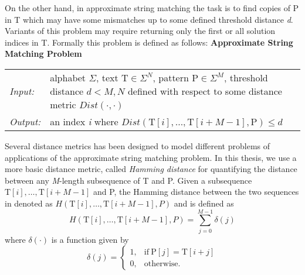 On the other hand, in approximate string matching the task is to find copies of P in T which may have some mismatches up to some defined threshold distance \textit{d}. Variants of this problem may require returning only the first or all solution indices in T. Formally this problem is defined as follows:\newline
\newline	
	\textbf{Approximate String Matching Problem}\\
	\begin{tabular}{ l  p{10cm}}
		\textit{Input:} & alphabet $\Sigma$, text $\mathrm{T} \in \Sigma^N$, pattern $\mathrm{P} \in \Sigma^M$, threshold distance $d < M,N$ defined with respect to some distance metric $Dist(\cdot,\cdot)$\\
		\textit{Output:} & an index \textit{i} where $Dist(\mathrm{T}[i],\ldots,\mathrm{T}[i+M-1],\mathrm{P}) \leq d$
	\end{tabular}\newline

Several distance metrics has been designed to model different problems of applications of the approximate string matching problem. In this thesis, we use a more basic distance metric, called \textit{Hamming distance} for quantifying the distance between any \textit{M}-length subsequence of T and P. Given a subsequence $\mathrm{T}[i],\ldots,\mathrm{T}[i+M-1]$ and P, the Hamming distance between the two sequences in denoted as $H\left( \mathrm{T}[i],\ldots,\mathrm{T}[i+M-1], P \right)$ and is defined as
\[
	H\left( \mathrm{T}[i],\ldots,\mathrm{T}[i+M-1], P \right) = \sum_{j=0}^{M-1} \delta(j)
\] 
where $\delta(\cdot)$ is a function given by
\[
	\delta(j)=
	\begin{cases}
		1, & \text{if}\ \mathrm{P}[j] = \mathrm{T}[i+j]\\
		0, & \text{otherwise}.
	\end{cases}
\]